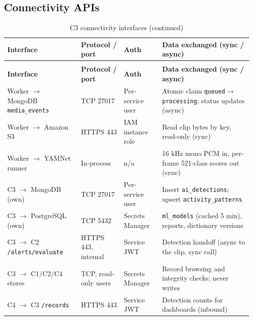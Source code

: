 \subsection{Connectivity APIs}
\begin{longtable}{L{3.4cm}L{2.6cm}L{2.2cm}L{6.4cm}}
\caption{C3 connectivity interfaces}\label{tab:c3-conn}\\
\toprule
\textbf{Interface} & \textbf{Protocol / port} & \textbf{Auth} & \textbf{Data exchanged (sync / async)} \\
\midrule
\endfirsthead
\caption[]{C3 connectivity interfaces (continued)}\\
\toprule
\textbf{Interface} & \textbf{Protocol / port} & \textbf{Auth} & \textbf{Data exchanged (sync / async)} \\
\midrule
\endhead
Worker $\rightarrow$ MongoDB \texttt{media\_events} & TCP 27017 & Per-service user & Atomic claim \texttt{queued}$\rightarrow$\texttt{processing}; status updates (async) \\
Worker $\rightarrow$ Amazon S3 & HTTPS 443 & IAM instance role & Read clip bytes by key, read-only (sync) \\
Worker $\rightarrow$ YAMNet runner & In-process & n/a & 16 kHz mono PCM in, per-frame 521-class scores out (sync) \\
C3 $\rightarrow$ MongoDB (own) & TCP 27017 & Per-service user & Insert \texttt{ai\_detections}; upsert \texttt{activity\_patterns} \\
C3 $\rightarrow$ PostgreSQL (own) & TCP 5432 & Secrets Manager & \texttt{ml\_models} (cached 5 min), reports, dictionary versions \\
C3 $\rightarrow$ C2 \texttt{/alerts/evaluate} & HTTPS 443, internal & Service JWT & Detection handoff (async to the clip, sync call) \\
C3 $\rightarrow$ C1/C2/C4 stores & TCP, read-only users & Secrets Manager & Record browsing and integrity checks; never writes \\
C4 $\rightarrow$ C3 \texttt{/records} & HTTPS 443 & Service JWT & Detection counts for dashboards (inbound) \\
\bottomrule
\end{longtable}

